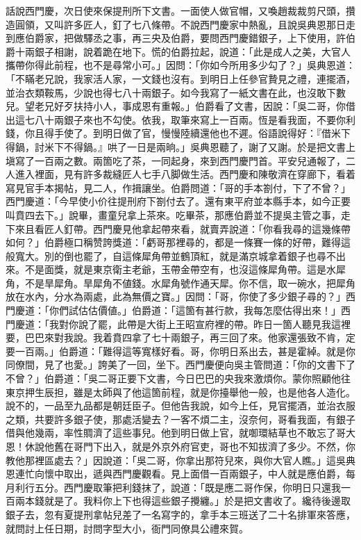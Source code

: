 話說西門慶，次日使來保提刑所下文書。一面使人做官帽，又喚趙裁裁剪尺頭，攢造圓領，又叫許多匠人，釘了七八條帶。不說西門慶家中熱亂，且說吳典恩那日走到應伯爵家，把做驛丞之事，再三央及伯爵，要問西門慶錯銀子，上下使用，許伯爵十兩銀子相謝，說着跪在地下。慌的伯爵拉起，說道：「此是成人之美，大官人攜帶你得此前程，也不是尋常小可。」因問：「你如今所用多少勾了？」吳典恩道：「不瞞老兄說，我家活人家，一文錢也沒有。到明日上任參官贄見之禮，連擺酒，並治衣類鞍馬，少說也得七八十兩銀子。如今我寫了一紙文書在此，也沒敢下數兒。望老兄好歹扶持小人，事成恩有重報。」伯爵看了文書，因說：「吳二哥，你借出這七八十兩銀子來也不勾使。依我，取筆來寫上一百兩。恆是看我面，不要你利錢，你且得手使了。到明日做了官，慢慢陸續還他也不遲。俗語說得好：『借米下得鍋，討米下不得鍋。』哄了一日是兩晌。」{}吳典恩聽了，謝了又謝。於是把文書上塡寫了一百兩之數。兩箇吃了茶，一同起身，來到西門慶門首。平安兒通報了，二人進入裡面，見有許多裁縫匠人七手八脚做生活。西門慶和陳敬濟在穿廊下，看着寫見官手本揭帖，見二人，作揖讓坐。伯爵問道：「哥的手本劄付，下了不曾？」西門慶道：「今早使小价往提刑府下劄付去了。還有東平府並本縣手本，如今正要叫賁四去下。」說畢，畫童兒拿上茶來。吃畢茶，那應伯爵並不提吳主管之事，{}走下來且看匠人釘帶。西門慶見他拿起帶來看，就賣弄說道：「你看我尋的這幾條帶如何？」伯爵極口稱赞誇獎道：「虧哥那裡尋的，都是一條賽一條的好帶，難得這般寬大。別的倒也罷了，自這條犀角帶並鶴頂紅，就是滿京城拿着銀子也尋不出來。不是面獎，就是東京衛主老爺，玉帶金帶空有，也沒這條犀角帶。這是水犀角，不是旱犀角。旱犀角不値錢。水犀角號作通天犀。你不信，取一碗水，把犀角放在水內，分水為兩處，此為無價之寶。」{}因問：「哥，你使了多少銀子尋的？」西門慶道：「你們試估估價値。」伯爵道：「這箇有甚行款，我每怎麼估得出來！」西門慶道：「我對你說了罷，此帶是大街上王昭宣府裡的帶。昨日一箇人聽見我這裡要，巴巴來對我說。我着賁四拿了七十兩銀子，再三回了來。他家還張致不肯，定要一百兩。」伯爵道：「難得這等寬樣好看。哥，你明日系出去，甚是霍綽。就是你同僚間，見了也愛。」誇美了一回，坐下。西門慶便向吳主管問道：「你的文書下了不曾？」{}伯爵道：「吳二哥正要下文書，今日巴巴的央我來激煩你。蒙你照顧他往東京押生辰担，雖是太師與了他這箇前程，就是你擡舉他一般，也是他各人造化。說不的，一品至九品都是朝廷臣子。但他告我說，如今上任，見官擺酒，並治衣服之類，共要許多銀子使，那處活變去？一客不煩二主，沒奈何，哥看我面，{}有銀子借與他幾兩，率性賙濟了這些事兒。他到明日做上官，就啣環結草也不敢忘了哥大恩！休說他舊在哥門下出入，就是外京外府官吏，哥也不知拔濟了多少。不然，你教他那裡區處去？」{}因說道：「吳二哥，你拿出那符兒來，{}與你大官人瞧。」這吳典恩連忙向懷中取出，遞與西門慶觀看。見上面借一百兩銀子，中人就是應伯爵，每月利行五分。西門慶取筆把利錢抹了，說道：「既是應二哥作保，你明日只還我一百兩本錢就是了。我料你上下也得這些銀子攪纏。」於是把文書收了。纔待後邊取銀子去，忽有夏提刑拿帖兒差了一名寫字的，拿手本三班送了二十名排軍來答應，{}就問討上任日期，討問字型大小，衙門同僚具公禮來賀。